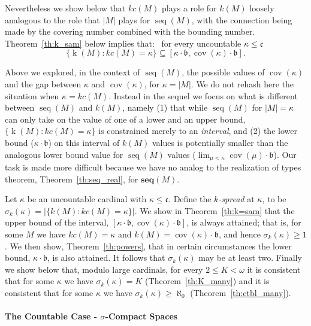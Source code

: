 \documentclass{article}
\begin{document}
Nevertheless we show below that $kc(M)$ plays a role for $k(M)$ loosely analogous to the role that $|M|$ plays for $\mathop{seq}(M)$, with the connection being made by the covering number combined with the bounding number. 
Theorem~\ref{th:k_sam} below implies that:  \ for every uncountable $\kappa \le \mathfrak{c}$
\[\{\mathop{k}(M) : kc(M)=\kappa\} \subseteq [\kappa\cdot\mathfrak{b},\mathop{cov}(\kappa)\cdot\mathfrak{b}].\]


Above we explored, in the context of $\mathop{seq}(M)$, the possible values of $\mathop{cov}(\kappa)$ and the gap between $\kappa$ and $\mathop{cov}(\kappa)$, for $\kappa=|M|$. We do not rehash here the situation when $\kappa=kc(M)$. Instead in the sequel we focus on what is different between  $\mathop{seq}(M)$ and $k(M)$, 
namely (1)  that while $\mathop{seq}(M)$  for $|M|=\kappa$ can only take on the value of one of a lower and an upper bound,  
$\{\mathop{k}(M) : kc(M)=\kappa\}$ is constrained merely to an \emph{interval},  and (2) the lower bound ($\kappa\cdot\mathfrak{b}$) on this interval of $k(M)$ values is potentially smaller than the analogous lower bound value for $\mathop{seq}(M)$ values ($\lim_{\mu <\kappa} \mathop{cov}(\mu)\cdot\mathfrak{b}$). 
Our task is made more difficult because we have no analog to the realization of types theorem, Theorem~\ref{th:seq_real}, for $\mathbf{seq}(M)$. 

Let $\kappa$ be an uncountable cardinal  with $\kappa \le \mathfrak{c}$.  Define the \emph{$k$-spread} at $\kappa$, to be $\sigma_k(\kappa)=|\{k(M) : kc(M)=\kappa\}|$. We show in Theorem~\ref{th:k=sam} that 
the upper bound of the interval, $[\kappa\cdot\mathfrak{b},\mathop{cov}(\kappa)\cdot\mathfrak{b}]$, is always attained; that is, for some $M$ we have $kc(M)=\kappa$ and $k(M)=\mathop{cov}(\kappa)\cdot\mathfrak{b}$, and hence $\sigma_k(\kappa) \ge 1$. 
We then show, Theorem~\ref{th:powers}, that in certain circumstances the lower bound, $\kappa\cdot\mathfrak{b}$, is also attained. It follows that $\sigma_k(\kappa)$ may be at least two. 
Finally we show below that, modulo large cardinals, for every $2 \le K < \omega$ it is consistent that for some $\kappa$ we have 
$\sigma_k(\kappa)=K$ (Theorem~\ref{th:K_many})  and it is consistent that for some $\kappa$ we have 
$\sigma_k(\kappa)\ge \aleph_0$ (Theorem~\ref{th:ctbl_many}). 



 

\paragraph{The Countable Case - $\sigma$-Compact Spaces}
\end{document}
